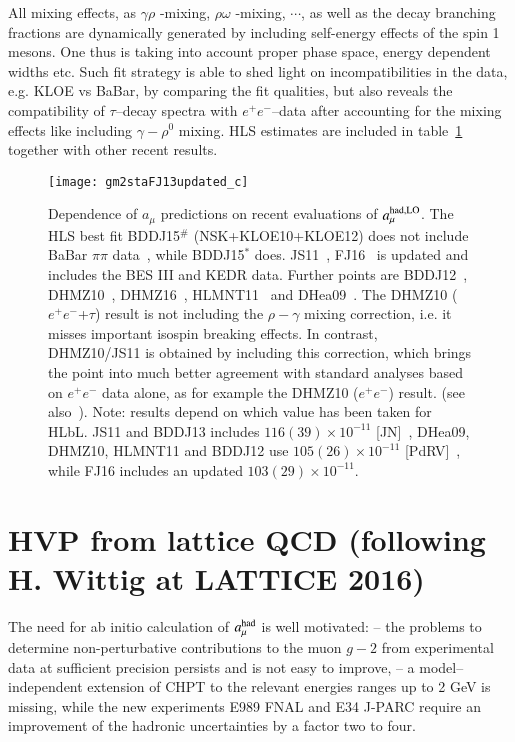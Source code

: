 \documentclass[epj,onecolumn]{webofc}
\newcommand{\mbo}[1]{$#1$ }
\newcommand{\epm}{e^+e^- }
\newcommand{\power}[1]{\times 10^{#1} }
\begin{document}
All mixing effects, as \mbo{\gamma\rho}-mixing,
\mbo{\rho\omega}-mixing, $\cdots$, as well as the decay branching fractions are
dynamically generated by including self-energy effects of the spin 1
mesons. One thus is taking into account proper phase space, energy dependent widths
etc. Such fit strategy is able to shed light on incompatibilities in
the data, e.g. KLOE vs BaBar, by comparing the fit qualities, but also
reveals the compatibility of $\tau$--decay spectra with $\epm$--data
after accounting for the mixing effects like including $\gamma-\rho^0$
mixing. HLS estimates are included in table~\ref{fig:compare} together
with other recent results.
\begin{figure}
\centering
\texttt{[image: gm2staFJ13updated\_c]}
\caption{Dependence of $a_\mu$ predictions on recent evaluations of
$a_\mu^{\rm had,LO}$. The HLS best fit BDDJ15{$^{\#}$}
(NSK+KLOE10+KLOE12) does not include BaBar $\pi\pi$
data~\cite{Benayoun:2015gxa}, while BDDJ15{$^*$} does.
JS11~\cite{JS11}, FJ16~\cite{Jegerlehner:2015stw} is updated and includes the BES III
and KEDR data. Further points are BDDJ12~\cite{Benayoun:2011mm},
DHMZ10~\cite{Davier:2010nc}, DHMZ16~\cite{Davier:2016udg,Davier:2016iru}, HLMNT11~\cite{HMNT11} and
DHea09~\cite{Davier:2009ag}.
The DHMZ10 ($\epm$+$\tau$) result is not including the $\rho-\gamma$
mixing correction, i.e. it misses important isospin breaking
effects. In contrast, DHMZ10/JS11 is obtained by including this
correction, which brings the point into much better agreement with standard
analyses based on $\epm$ data alone, as for example the DHMZ10 ($\epm$) result.
(see also~\cite{Davier:2015bka,Zhang:2015yfi}). Note: results depend on which
value has been taken for HLbL. JS11 and BDDJ13 includes
$116(39)\power{-11}$ [JN]~\cite{JN},
DHea09, DHMZ10, HLMNT11 and BDDJ12 use $105(26)\power{-11}$
[PdRV]~\cite{PdRV}, while FJ16 includes an updated $103(29)\power{-11}$.}
\label{fig:compare}
\end{figure}



\section{HVP from lattice QCD (following H. Wittig at LATTICE 2016)}
\label{sec-5}
The need for ab initio calculation of $a_\mu^{\rm had}$ is well
motivated: -- the problems to determine non-perturbative contributions
to the muon $g-2$ from experimental data at sufficient precision
persists and is not easy to improve, -- a model--independent extension
of CHPT to the relevant energies ranges up to 2 GeV is missing, while
the new experiments E989 \@ FNAL and E34 \@ J-PARC require an
improvement of the hadronic uncertainties by a factor two to four.
\end{document}
